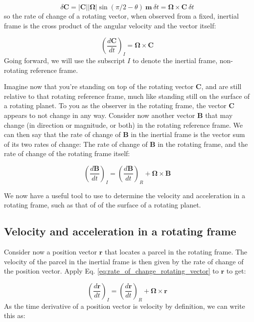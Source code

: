 \documentclass[12pt]{article}
\numberwithin{equation}{section}
\numberwithin{figure}{section}
\numberwithin{table}{section}
\begin{document}
\begin{equation}
  \delta \mathbf{C} = |\mathbf{C}| |\mathbf{\Omega}| \sin(\pi/2 - \theta)\ \mathbf{m}\ \delta t =
  \mathbf{\Omega} \times \mathbf{C}\ \delta t
\end{equation}
so the rate of change of a rotating vector, when observed from a fixed, inertial
frame is the cross product of the angular velocity and the vector itself:

\begin{equation}
  \left(\frac{d\mathbf{C}}{dt}\right)_I = \mathbf{\Omega} \times \mathbf{C}
\end{equation}
Going forward, we will use the subscript $I$ to denote the inertial frame,
non-rotating reference frame.

Imagine now that you're standing on top of the rotating vector $\mathbf{C}$,
and are still relative to that rotating reference frame, much like standing
still on the surface of a rotating planet.
To you as the observer in the rotating frame, the vector $\mathbf{C}$ appears
to not change in any way.
Consider now another vector $\mathbf{B}$ that may change (in direction or
magnitude, or both) in the rotating reference frame.
We can then say that the rate of change of $\mathbf{B}$ in the inertial frame
is the vector sum of its two rates of change:
The rate of change of $\mathbf{B}$ in the rotating frame, and the rate of
change of the rotating frame itself:

\begin{equation}
  \left(\frac{d\mathbf{B}}{dt}\right)_I = \left(\frac{d\mathbf{B}}{dt}\right)_R + \mathbf{\Omega} \times \mathbf{B}
  \label{eq:rate_of_change_rotating_vector}
\end{equation}

We now have a useful tool to use to determine the velocity and acceleration in
a rotating frame, such as that of of the surface of a rotating planet.

\subsection{Velocity and acceleration in a rotating frame}

Consider now a position vector $\mathbf{r}$ that locates a parcel in the rotating
frame.
The velocity of the parcel in the inertial frame is then given by the rate of
change of the position vector.
Apply Eq. \ref{eq:rate_of_change_rotating_vector} to $\mathbf{r}$ to get:

\begin{equation}
  \left( \frac{d\mathbf{r}}{dt} \right)_I = \left( \frac{d\mathbf{r}}{dt} \right)_R + \mathbf{\Omega} \times \mathbf{r}
\end{equation}
As the time derivative of a position vector is velocity by definition, we can
write this as:
\end{document}
